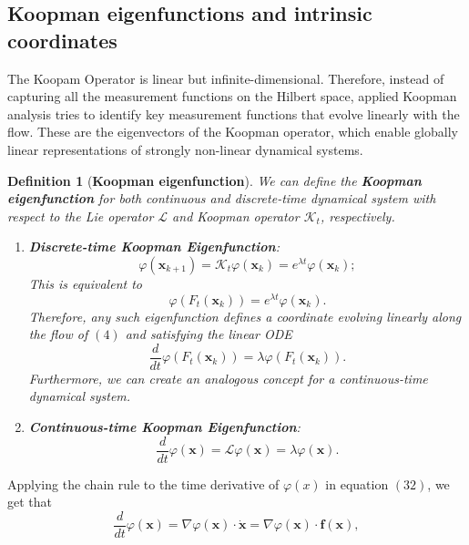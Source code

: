 \documentclass[]{article}
\newtheorem{definition}{Definition}
\begin{document}
\subsection{Koopman eigenfunctions and intrinsic coordinates}
The Koopam Operator is linear but infinite-dimensional. Therefore, instead of capturing all the measurement functions on the Hilbert space, applied Koopman analysis tries to identify key measurement functions that evolve linearly with the flow. These are the eigenvectors of the Koopman operator, which enable globally linear representations of strongly non-linear dynamical systems. 
\begin{definition}[\textbf{Koopman eigenfunction}]
We can define the \textbf{Koopman eigenfunction} for both continuous and discrete-time dynamical system with respect to the Lie operator $\mathcal{L}$ and Koopman operator $\mathcal{K}_{t}$, respectively.
\begin{enumerate}
	\item \textbf{Discrete-time Koopman Eigenfunction}:
	\begin{equation}
		\varphi(\textbf{x}_{k+1}) = \mathcal{K}_{t} \varphi(\textbf{x}_k) = e^{\lambda t} \varphi(\textbf{x}_k);
	\end{equation}
	This is equivalent to
		\begin{equation}
			\varphi(F_t(\textbf{x}_k)) = e^{\lambda t} 	\varphi(\textbf{x}_k).
		\end{equation}
	Therefore, any such eigenfunction defines a coordinate evolving linearly along the flow of $(4)$ and satisfying the linear ODE
	\begin{equation}
		\frac{d}{dt}\varphi(F_t(\textbf{x}_k)) = \lambda \varphi(F_t(\textbf{x}_k)).
	\end{equation}
	Furthermore, we can create an analogous concept for a continuous-time dynamical system.
	\item \textbf{Continuous-time Koopman Eigenfunction}:
	\begin{equation}
		\frac{d}{dt}\varphi(\textbf{x}) = \mathcal{L} \varphi(\textbf{x}) = \lambda \varphi(\textbf{x}).
	\end{equation}
\end{enumerate}
\end{definition}
Applying the chain rule to the time derivative of $\varphi(x)$ in equation $(32)$, we get that
\begin{equation}
	\frac{d}{dt}\varphi(\textbf{x}) = \nabla \varphi(\textbf{x}) \cdot \dot{\textbf{x}} = \nabla \varphi(\textbf{x}) \cdot \textbf{f}(\textbf{x}),
\end{equation}
\end{document}
